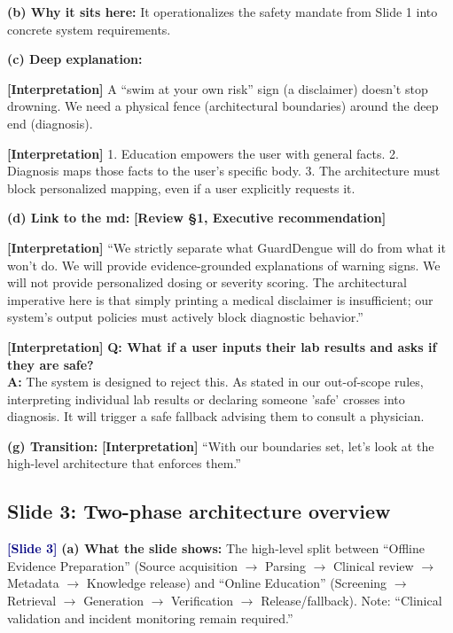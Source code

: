 \documentclass[11pt,a4paper]{article}
\newcommand{\origintag}[2]{\textcolor{#1}{\small\textbf{[#2]}}}
\begin{document}
\textbf{(b) Why it sits here:} It operationalizes the safety mandate from Slide 1 into concrete system requirements.

\textbf{(c) Deep explanation:}
\begin{analogy}
\origintag{slate}{Interpretation} A ``swim at your own risk'' sign (a disclaimer) doesn't stop drowning. We need a physical fence (architectural boundaries) around the deep end (diagnosis).
\end{analogy}
\origintag{slate}{Interpretation} 1. Education empowers the user with general facts. 2. Diagnosis maps those facts to the user's specific body. 3. The architecture must block personalized mapping, even if a user explicitly requests it.

\textbf{(d) Link to the md:} \origintag{amber}{Review \S1, Executive recommendation}

\begin{sayit}
\origintag{slate}{Interpretation} ``We strictly separate what GuardDengue will do from what it won't do. We will provide evidence-grounded explanations of warning signs. We will not provide personalized dosing or severity scoring. The architectural imperative here is that simply printing a medical disclaimer is insufficient; our system's output policies must actively block diagnostic behavior.''
\end{sayit}

\begin{qa}
\origintag{slate}{Interpretation} \textbf{Q: What if a user inputs their lab results and asks if they are safe?} \\
\textbf{A:} The system is designed to reject this. As stated in our out-of-scope rules, interpreting individual lab results or declaring someone 'safe' crosses into diagnosis. It will trigger a safe fallback advising them to consult a physician.
\end{qa}
\textbf{(g) Transition:} \origintag{slate}{Interpretation} ``With our boundaries set, let's look at the high-level architecture that enforces them.''

\subsection{Slide 3: Two-phase architecture overview}
\origintag{navy}{Slide 3}
\textbf{(a) What the slide shows:} The high-level split between ``Offline Evidence Preparation'' (Source acquisition $\rightarrow$ Parsing $\rightarrow$ Clinical review $\rightarrow$ Metadata $\rightarrow$ Knowledge release) and ``Online Education'' (Screening $\rightarrow$ Retrieval $\rightarrow$ Generation $\rightarrow$ Verification $\rightarrow$ Release/fallback). Note: ``Clinical validation and incident monitoring remain required.''
\end{document}
